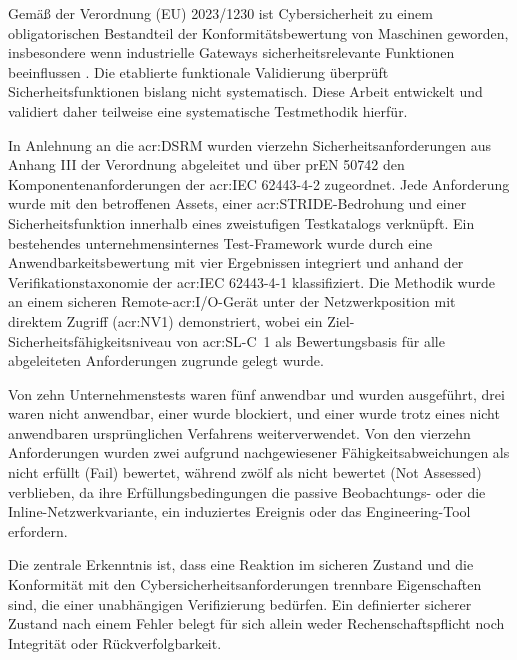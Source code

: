 Gemäß der Verordnung (EU) 2023/1230 ist Cybersicherheit zu einem obligatorischen Bestandteil der Konformitätsbewertung von Maschinen geworden, insbesondere wenn industrielle Gateways sicherheitsrelevante Funktionen beeinflussen \cite[p. 4]{EU2023_1230}. Die etablierte funktionale Validierung überprüft Sicherheitsfunktionen bislang nicht systematisch. Diese Arbeit entwickelt und validiert daher teilweise eine systematische Testmethodik hierfür.

In Anlehnung an die \acrfull{acr:DSRM} wurden vierzehn Sicherheitsanforderungen aus Anhang III der Verordnung abgeleitet und über prEN 50742 den Komponentenanforderungen der \acrshort{acr:IEC} 62443-4-2 zugeordnet. Jede Anforderung wurde mit den betroffenen Assets, einer \acrshort{acr:STRIDE}-Bedrohung und einer Sicherheitsfunktion innerhalb eines zweistufigen Testkatalogs verknüpft. Ein bestehendes unternehmensinternes Test-Framework wurde durch eine Anwendbarkeitsbewertung mit vier Ergebnissen integriert und anhand der Verifikationstaxonomie der \acrshort{acr:IEC} 62443-4-1 klassifiziert. Die Methodik wurde an einem sicheren Remote-\gls{acr:I/O}-Gerät unter der Netzwerkposition mit direktem Zugriff (\acrshort{acr:NV1}) demonstriert, wobei ein Ziel-Sicherheitsfähigkeitsniveau von \acrshort{acr:SL-C}~1 als Bewertungsbasis für alle abgeleiteten Anforderungen zugrunde gelegt wurde.

Von zehn Unternehmenstests waren fünf anwendbar und wurden ausgeführt, drei waren nicht anwendbar, einer wurde blockiert, und einer wurde trotz eines nicht anwendbaren ursprünglichen Verfahrens weiterverwendet. Von den vierzehn Anforderungen wurden zwei aufgrund nachgewiesener Fähigkeitsabweichungen als nicht erfüllt (Fail) bewertet, während zwölf als nicht bewertet (Not Assessed) verblieben, da ihre Erfüllungsbedingungen die passive Beobachtungs- oder die Inline-Netzwerkvariante, ein induziertes Ereignis oder das Engineering-Tool erfordern.

Die zentrale Erkenntnis ist, dass eine Reaktion im sicheren Zustand und die Konformität mit den Cybersicherheitsanforderungen trennbare Eigenschaften sind, die einer unabhängigen Verifizierung bedürfen. Ein definierter sicherer Zustand nach einem Fehler belegt für sich allein weder Rechenschaftspflicht noch Integrität oder Rückverfolgbarkeit.

\clearpage